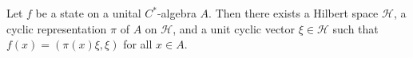 Let $f$ be a state on a unital $C^*$-algebra $A$. Then there exists a Hilbert space $\mathcal{H}$, a cyclic representation $\pi$ of $A$ on $\mathcal{H}$, and a unit cyclic vector $\xi \in \mathcal{H}$ such that $f(x) = (\pi(x)\xi, \xi)$ for all $x \in A$.
